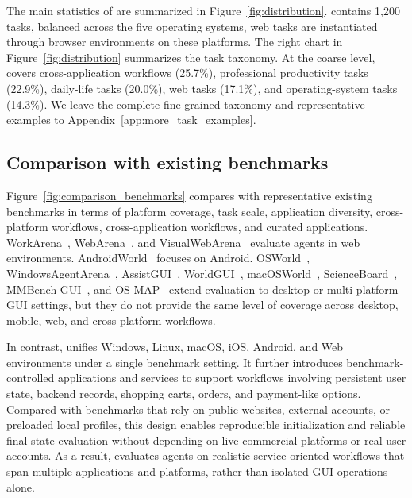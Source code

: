 
The main statistics of \dataset are summarized in Figure~\ref{fig:distribution}. \dataset contains 1,200 tasks, balanced across the five operating systems, web tasks are instantiated through browser environments on these platforms. The right chart in Figure~\ref{fig:distribution} summarizes the task taxonomy. At the coarse level, \dataset covers cross-application workflows (25.7\%), professional productivity tasks (22.9\%), daily-life tasks (20.0\%), web tasks (17.1\%), and operating-system tasks (14.3\%). We leave the complete fine-grained taxonomy and representative examples to Appendix~\ref{app:more_task_examples}.




\subsection{Comparison with existing benchmarks}
Figure~\ref{fig:comparison_benchmarks} compares \dataset with representative existing benchmarks in terms of platform coverage, task scale, application diversity, cross-platform workflows, cross-application workflows, and curated applications. WorkArena~\citep{drouin2024workarena}, WebArena~\citep{zhou2023webarena}, and VisualWebArena~\citep{koh2024visualwebarena} evaluate agents in web environments. AndroidWorld~\citep{rawles2024androidworld} focuses on Android. OSWorld~\citep{yang2025macosworld}, WindowsAgentArena~\citep{bonatti2024windows}, AssistGUI~\citep{gao2023assistgui}, WorldGUI~\citep{zhao2025worldgui}, macOSWorld~\citep{yang2025macosworld}, ScienceBoard~\citep{sun2025scienceboard}, MMBench-GUI~\citep{wang2025mmbench}, and OS-MAP~\citep{chen2025map} extend evaluation to desktop or multi-platform GUI settings, but they do not provide the same level of coverage across desktop, mobile, web, and cross-platform workflows.

In contrast, \dataset unifies Windows, Linux, macOS, iOS, Android, and Web environments under a single benchmark setting. It further introduces benchmark-controlled applications and services to support workflows involving persistent user state, backend records, shopping carts, orders, and payment-like options. Compared with benchmarks that rely on public websites, external accounts, or preloaded local profiles, this design enables reproducible initialization and reliable final-state evaluation without depending on live commercial platforms or real user accounts. As a result, \dataset evaluates agents on realistic service-oriented workflows that span multiple applications and platforms, rather than isolated GUI operations alone.